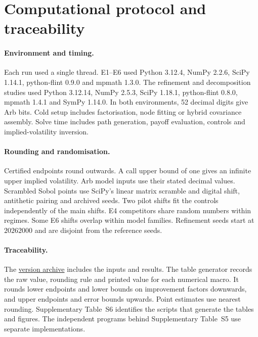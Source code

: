 \section{Computational protocol and traceability}
\label{app:repro}

\paragraph{Environment and timing.}
Each run used a single thread. E1--E6 used Python 3.12.4, NumPy 2.2.6, SciPy 1.14.1, python-flint 0.9.0 and mpmath 1.3.0. The refinement and decomposition studies used Python 3.12.14, NumPy 2.5.3, SciPy 1.18.1, python-flint 0.8.0, mpmath 1.4.1 and SymPy 1.14.0. In both environments, 52 decimal digits give \ArbBits{} Arb bits. Cold setup includes factorisation, node fitting or hybrid covariance assembly. Solve time includes path generation, payoff evaluation, controls and implied-volatility inversion.

\paragraph{Rounding and randomisation.}
Certified endpoints round outwards. A call upper bound of one gives an infinite upper implied volatility. Arb model inputs use their stated decimal values. Scrambled Sobol points use SciPy's linear matrix scramble and digital shift, antithetic pairing and archived seeds. Two pilot shifts fit the controls independently of the main shifts. E4 competitors share random numbers within regimes. Some E6 shifts overlap within model families. Refinement seeds start at $20262000$ and are disjoint from the reference seeds.

\paragraph{Traceability.}
The \href{\ReleaseURL}{version \ReleaseTag{} archive} includes the inputs and results. The table generator records the raw value, rounding rule and printed value for each numerical macro. It rounds lower endpoints and lower bounds on improvement factors downwards, and upper endpoints and error bounds upwards. Point estimates use nearest rounding. Supplementary Table~S6 identifies the scripts that generate the tables and figures. The independent programs behind Supplementary Table~S5 use separate implementations.
